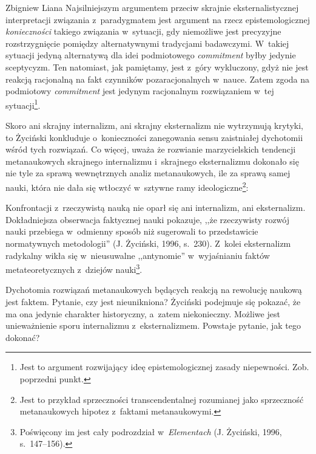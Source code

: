 \begin{artplenv}{Zbigniew Liana}
Najsilniejszym argumentem przeciw skrajnie eksternalistycznej interpretacji związania z~paradygmatem jest argument na
rzecz epistemologicznej \textit{konieczności} takiego związania w~sytuacji, gdy niemożliwe jest precyzyjne
rozstrzygnięcie pomiędzy alternatywnymi tradycjami badawczymi. W~takiej sytuacji jedyną alternatywą dla idei
podmiotowego \textit{commitment} byłby jedynie sceptycyzm. Ten natomiast, jak pamiętamy, jest z~góry wykluczony, gdyż nie
jest reakcją racjonalną na fakt czynników pozaracjonalnych w~nauce. Zatem zgoda na podmiotowy \textit{commitment} jest
jedynym racjonalnym rozwiązaniem w~tej sytuacji\footnote{Jest to argument rozwijający ideę epistemologicznej zasady
niepewności. Zob. poprzedni punkt. }.

Skoro ani skrajny internalizm, ani skrajny eksternalizm nie wytrzymują krytyki, to Życiński konkluduje o~konieczności
zanegowania sensu zaistniałej dychotomii wśród tych rozwiązań. Co więcej, uważa że rozwianie marzycielskich tendencji
metanaukowych skrajnego internalizmu i~skrajnego eksternalizmu dokonało się nie tyle za sprawą wewnętrznych analiz
metanaukowych, ile za sprawą samej nauki, która nie dała się wtłoczyć w~sztywne ramy ideologiczne\footnote{Jest to
przykład sprzeczności transcendentalnej rozumianej jako sprzeczność metanaukowych hipotez z~faktami metanaukowymi.}:


Konfrontacji z~rzeczywistą nauką nie oparł się ani internalizm, ani eksternalizm. Dokładniejsza obserwacja faktycznej
nauki pokazuje, ,,że rzeczywisty rozwój nauki przebiega w~odmienny sposób niż sugerowali to przedstawicie normatywnych
metodologii'' \label{ref:RNDWCF6lU0sbi}(J. Życiński, 1996, s.~230). Z~kolei eksternalizm radykalny wikła
się w~nieusuwalne ,,antynomie'' w~wyjaśnianiu faktów metateoretycznych z~dziejów nauki\footnote{Poświęcony im jest cały
podrozdział w~\textit{Elementach} \label{ref:RNDrpsugHpH8D}(J. Życiński, 1996, s.~147–156).}.

Dychotomia rozwiązań metanaukowych będących reakcją na rewolucję naukową jest faktem. Pytanie, czy jest nieunikniona?
Życiński podejmuje się pokazać, że ma ona jedynie charakter historyczny, a~zatem niekonieczny. Możliwe jest
unieważnienie sporu internalizmu z~eksternalizmem. Powstaje pytanie, jak tego dokonać?


\end{artplenv}

